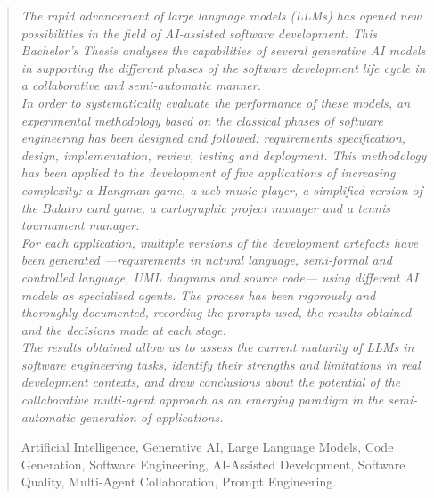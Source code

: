 \documentclass[english,a4paper,12pt,oneside]{extreport}
\newenvironment{keywords}
{\begin{list}{}{\setlength{\leftmargin}{1em}}\item[\hskip\labelsep \bfseries Keywords:]}
{\end{list}}
\begin{document}
\newpage  %
\begin{abstract}
{\em
The rapid advancement of large language models (LLMs) has opened new possibilities in the field of AI-assisted software development. This Bachelor's Thesis analyses the capabilities of several generative AI models in supporting the different phases of the software development life cycle in a collaborative and semi-automatic manner.\\

In order to systematically evaluate the performance of these models, an experimental methodology based on the classical phases of software engineering has been designed and followed: requirements specification, design, implementation, review, testing and deployment. This methodology has been applied to the development of five applications of increasing complexity: a Hangman game, a web music player, a simplified version of the Balatro card game, a cartographic project manager and a tennis tournament manager.\\

For each application, multiple versions of the development artefacts have been generated ---requirements in natural language, semi-formal and controlled language, UML diagrams and source code--- using different AI models as specialised agents. The process has been rigorously and thoroughly documented, recording the prompts used, the results obtained and the decisions made at each stage.\\

The results obtained allow us to assess the current maturity of LLMs in software engineering tasks, identify their strengths and limitations in real development contexts, and draw conclusions about the potential of the collaborative multi-agent approach as an emerging paradigm in the semi-automatic generation of applications.
}
\begin{keywords}
Artificial Intelligence, Generative AI, Large Language Models, Code Generation, Software Engineering, AI-Assisted Development, Software Quality, Multi-Agent Collaboration, Prompt Engineering.
\end{keywords}
\end{abstract}
\newpage{\pagestyle{empty}}
\thispagestyle{empty}

\pagestyle{myheadings} %
\end{document}
